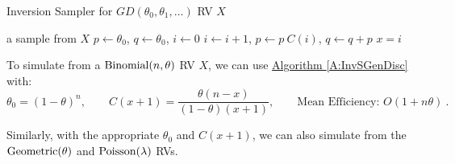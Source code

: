 \begin{algorithm}
\caption{Inversion Sampler for $GD(\theta_0,\theta_1,\ldots)$ RV $X$}
\label{A:InvSGenDisc}
\begin{algorithmic}[1]
 a sample from $X$
 $p \gets \theta_0$, $q \gets \theta_0$, $i \gets 0$
\STATE $i \gets i+1$, $p \gets p \ C(i)$, $q \gets q+p$
\ENDWHILE
{} $x = i$
\end{algorithmic}
\end{algorithm}



\begin{simulation}
To simulate from a $\mbox{{\rm Binomial}}(n,\theta)$ RV $X$, we can use \hyperref[A:InvSGenDisc]{Algorithm \ref*{A:InvSGenDisc}} with:
\[
\theta_0=(1-\theta)^n, \qquad C(x+1)=\frac{\theta(n-x)}{(1-\theta)(x+1)}, \qquad \text{Mean Efficiency: $O(1+n\theta)$} \ .
\]
\end{simulation}
Similarly, with the appropriate $\theta_0$ and $C(x+1)$, we can also simulate from the $\mbox{{\rm Geometric}}(\theta)$ and $\mbox{{\rm Poisson}}(\lambda)$ RVs.

